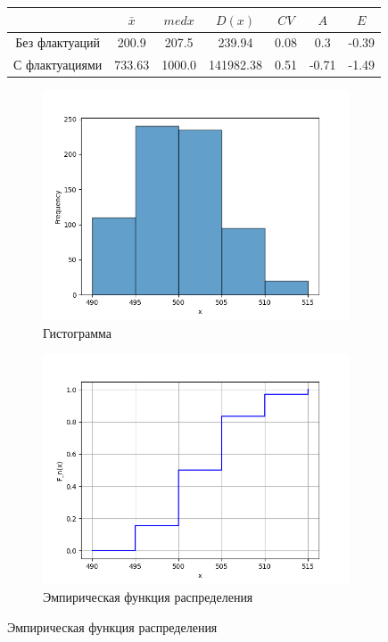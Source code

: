 \documentclass[12pt,a4paper]{article}
\begin{document}
\begin{figure}
		\begin{subtable}[htbp!]{0.8\textwidth}
			\centering
			\begin{tabular}{ |c|c|c|c|c|c|c| }
				\hline
				& \( \bar x \) & \( med x \) & \( D(x) \) & \( CV \) & \( A \) & \( E \) \\
				\hline
				Без флактуаций & 200.9 & 207.5 & 239.94 & 0.08 & 0.3 & -0.39 \\
				\hline
				С флактуациями & 733.63 & 1000.0 & 141982.38 & 0.51 & -0.71 & -1.49 \\
				\hline
			\end{tabular}
		\end{subtable}
	\end{figure}

	\begin{figure}
		\begin{subfigure}[htbp!]{0.8\textwidth}
			\begin{center}
				\includegraphics[width = 0.8\linewidth]{../graphics/8_hist.png}
				\caption{Гистограмма}
			\end{center}
		\end{subfigure}

		\begin{subfigure}[htbp!]{0.8\textwidth}
			\begin{center}
				\includegraphics[width = 0.8\linewidth]{../graphics/8_cdf.png}
				\caption{Эмпирическая функция распределения}
			\end{center}
		\end{subfigure}


\end{figure}
\end{document}
